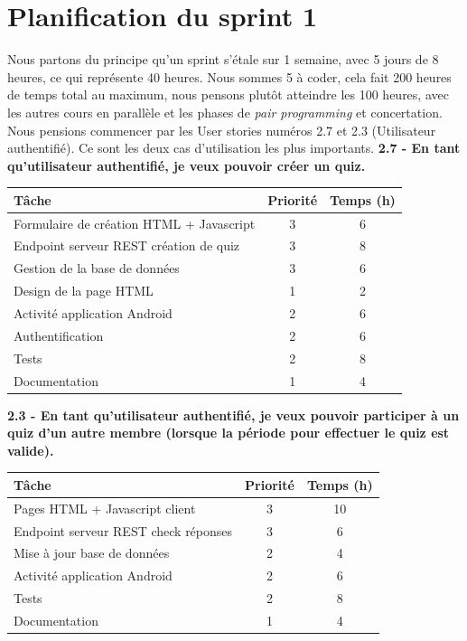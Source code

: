 \documentclass[a4paper, 12pt]{article}
\newenvironment{code}{\captionsetup{type=listing}}{}
\begin{document}
\section{Planification du sprint 1}
Nous partons du principe qu'un sprint s'étale sur 1 semaine, avec 5 jours de 8 heures, ce qui représente 
40 heures. Nous sommes 5 à coder, cela fait 200 heures de temps total au maximum, nous pensons plutôt atteindre les 100 heures, 
avec les autres cours en parallèle et les phases de \textit{pair programming} et concertation. Nous pensions commencer par les 
User stories numéros 2.7 et 2.3 (Utilisateur authentifié). Ce sont les deux cas d'utilisation les plus importants.
\bigbreak
\textbf{2.7 - En tant qu'utilisateur authentifié, je veux pouvoir créer un quiz.}
\bigbreak
\begin{tabular}{|p{.6\linewidth}|c|c|} \hline
	\textbf{Tâche} & \textbf{Priorité} & \textbf{Temps (h)} \\ \hline
	Formulaire de création HTML + Javascript & 3 & 6 \\ \hline
	Endpoint serveur REST création de quiz & 3 & 8 \\ \hline
	Gestion de la base de données & 3 & 6 \\ \hline
	Design de la page HTML & 1 & 2 \\ \hline
	Activité application Android & 2 & 6 \\ \hline
    Authentification & 2 & 6 \\ \hline
    Tests & 2 & 8 \\ \hline
    Documentation & 1 & 4 \\ \hline
\end{tabular}

\bigbreak
\bigbreak
\textbf{2.3 - En tant qu'utilisateur authentifié, je veux pouvoir participer à un quiz d'un autre membre (lorsque la période pour effectuer le quiz est valide).}
\bigbreak
\begin{tabular}{|p{.6\linewidth}|c|c|} \hline
	\textbf{Tâche} & \textbf{Priorité} & \textbf{Temps (h)} \\ \hline
	Pages HTML + Javascript client & 3 & 10 \\ \hline
	Endpoint serveur REST check réponses & 3 & 6 \\ \hline
	Mise à jour base de données & 2 & 4 \\ \hline
	Activité application Android & 2 & 6 \\ \hline
    Tests & 2 & 8 \\ \hline
    Documentation & 1 & 4 \\ \hline
\end{tabular}



\end{document}
